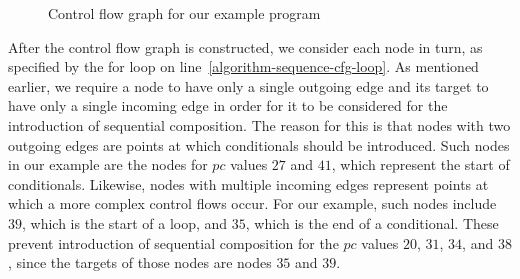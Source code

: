 \begin{figure}
  \begin{center}
    \footnotesize
  \end{center}
  \caption{Control flow graph for our example program}
  \label{example-control-flow-graph-figure}
\end{figure}

After the control flow graph is constructed, we consider each node in
turn, as specified by the for loop on
line~\ref{algorithm-sequence-cfg-loop}.
As mentioned earlier, we require a node to have only a single outgoing
edge and its target to have only a single incoming edge in order for
it to be considered for the introduction of sequential composition.
The reason for this is that nodes with two outgoing edges are points
at which conditionals should be introduced.
Such nodes in our example are the nodes for $pc$ values $27$ and $41$,
which represent the start of conditionals.
Likewise, nodes with multiple incoming edges represent points at which
a more complex control flows occur.
For our example, such nodes include $39$, which is the start of a
loop, and $35$, which is the end of a conditional.
These prevent introduction of sequential composition for the $pc$
values $20$, $31$, $34$, and $38$, since the targets of those nodes
are nodes $35$ and $39$.

